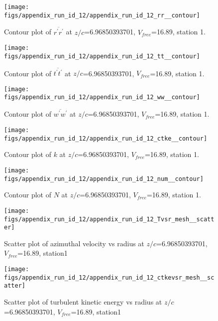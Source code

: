 \begin{figure}[H]
\centering
\texttt{[image: figs/appendix\_run\_id\_12/appendix\_run\_id\_12\_rr\_\_contour]}
\caption{Contour plot of $\overline{r^\prime r^\prime}$ at $z/c$=6.96850393701, $V_{free}$=16.89, station 1.}
\label{fig:appendix_run_id_12_rr__contour}
\end{figure}


\begin{figure}[H]
\centering
\texttt{[image: figs/appendix\_run\_id\_12/appendix\_run\_id\_12\_tt\_\_contour]}
\caption{Contour plot of $\overline{t^\prime t^\prime}$ at $z/c$=6.96850393701, $V_{free}$=16.89, station 1.}
\label{fig:appendix_run_id_12_tt__contour}
\end{figure}


\begin{figure}[H]
\centering
\texttt{[image: figs/appendix\_run\_id\_12/appendix\_run\_id\_12\_ww\_\_contour]}
\caption{Contour plot of $\overline{w^\prime w^\prime}$ at $z/c$=6.96850393701, $V_{free}$=16.89, station 1.}
\label{fig:appendix_run_id_12_ww__contour}
\end{figure}


\begin{figure}[H]
\centering
\texttt{[image: figs/appendix\_run\_id\_12/appendix\_run\_id\_12\_ctke\_\_contour]}
\caption{Contour plot of $k$ at $z/c$=6.96850393701, $V_{free}$=16.89, station 1.}
\label{fig:appendix_run_id_12_ctke__contour}
\end{figure}


\begin{figure}[H]
\centering
\texttt{[image: figs/appendix\_run\_id\_12/appendix\_run\_id\_12\_num\_\_contour]}
\caption{Contour plot of $N$ at $z/c$=6.96850393701, $V_{free}$=16.89, station 1.}
\label{fig:appendix_run_id_12_num__contour}
\end{figure}


\begin{figure}[H]
\centering
\texttt{[image: figs/appendix\_run\_id\_12/appendix\_run\_id\_12\_Tvsr\_mesh\_\_scatter]}
\caption{Scatter plot of azimuthal velocity vs radius at $z/c$=6.96850393701, $V_{free}$=16.89, station1}
\label{fig:appendix_run_id_12_Tvsr_mesh__scatter}
\end{figure}


\begin{figure}[H]
\centering
\texttt{[image: figs/appendix\_run\_id\_12/appendix\_run\_id\_12\_ctkevsr\_mesh\_\_scatter]}
\caption{Scatter plot of turbulent kinetic energy vs radius at $z/c$=6.96850393701, $V_{free}$=16.89, station1}
\label{fig:appendix_run_id_12_ctkevsr_mesh__scatter}
\end{figure}


